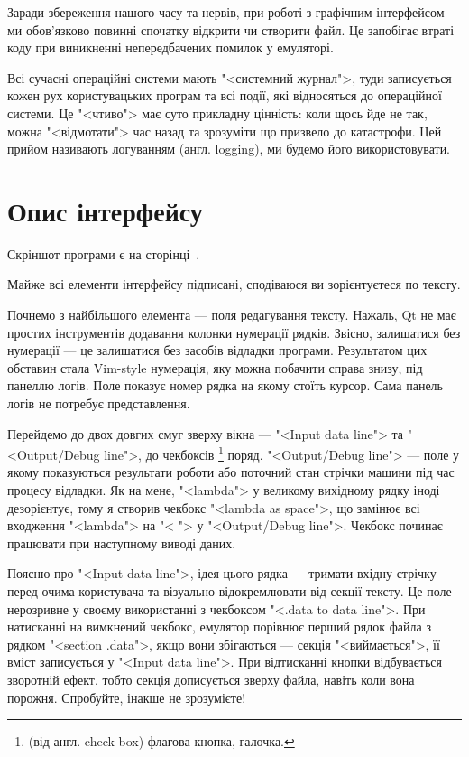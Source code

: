 \documentclass[oneside,final,14pt]{extreport}
\begin{document}
Заради збереження нашого часу та нервів, при роботі з графічним інтерфейсом ми обов'язково повинні спочатку відкрити чи створити файл. Це запобігає втраті коду при виникненні непередбачених помилок у емуляторі.

Всі сучасні операційні системи мають "<системний журнал">, туди записується кожен рух користувацьких програм та всі події, які відносяться до операційної системи. Це "<чтиво"> має суто прикладну цінність: коли щось йде не так, можна "<відмотати"> час назад та зрозуміти що призвело до катастрофи. Цей прийом називають логуванням (англ. logging), ми будемо його використовувати.
\section{Опис інтерфейсу}
Скріншот програми є на сторінці \,\pageref{screenshot}.
\medskip

Майже всі елементи інтерфейсу підписані, сподіваюся ви зорієнтуєтеся по тексту.

Почнемо з найбільшого елемента --- поля редагування тексту. Нажаль, Qt не має простих інструментів додавання колонки нумерації рядків. Звісно, залишатися без нумерації --- це залишатися без засобів відладки програми. Результатом цих обставин стала Vim-style нумерація, яку можна побачити справа знизу, під панеллю логів. Поле показує номер рядка на якому стоїть курсор. Сама панель логів не потребує представлення.

Перейдемо до двох довгих смуг зверху вікна ---  "<Input data line"> та "<Output/Debug line">, до чекбоксів
\footnote{(від англ. check box) флагова кнопка, галочка.}
поряд. "<Output/Debug line"> --- поле у якому показуються результати роботи або поточний стан стрічки машини під час процесу відладки. Як на мене, "<lambda"> у великому вихідному рядку іноді дезорієнтує, тому я створив  чекбокс "<lambda as space">, що замінює всі входження "<lambda"> на "< "> у "<Output/Debug line">. Чекбокс починає працювати при наступному виводі даних.

Поясню про "<Input data line">, ідея цього рядка --- тримати вхідну стрічку перед очима користувача та візуально відокремлювати від секції тексту. Це поле нерозривне у своєму використанні з чекбоксом "<.data to data line">. При натисканні на вимкнений чекбокс, емулятор порівнює перший рядок файла з рядком "<section .data">, якщо вони збігаються --- секція "<виймається">, її вміст записується у "<Input data line">. При відтисканні кнопки відбувається зворотній ефект, тобто секція дописується зверху файла, навіть коли вона порожня. Спробуйте, інакше не зрозумієте!
\end{document}
